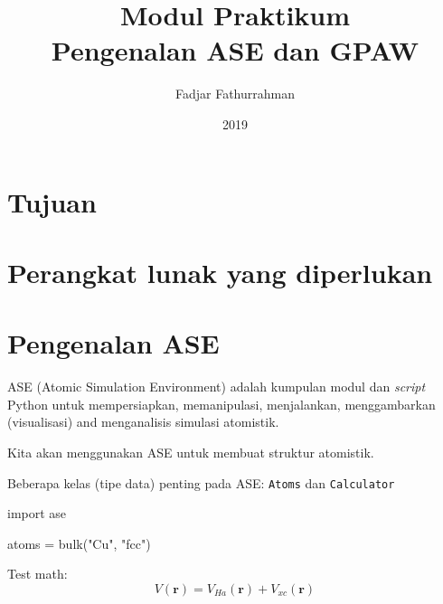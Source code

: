 \documentclass[a4paper,11pt]{extarticle}
\newcommand{\pyinline}[1]{\texttt{#1}}
\begin{document}
\title{
Modul Praktikum \\
Pengenalan \textsf{ASE} dan \textsf{GPAW}}
\author{Fadjar Fathurrahman}
\date{2019}
\maketitle

\section{Tujuan}


\section{Perangkat lunak yang diperlukan}


\section{Pengenalan \textsf{ASE}}

\textsf{ASE} (Atomic Simulation Environment) adalah kumpulan modul dan \textit{script} Python untuk
mempersiapkan, memanipulasi, menjalankan, menggambarkan (visualisasi) and menganalisis simulasi
atomistik.

Kita akan menggunakan \textsf{ASE} untuk membuat struktur atomistik.

Beberapa kelas (tipe data) penting pada \textsf{ASE}: \pyinline{Atoms} dan \pyinline{Calculator}

\begin{pythoncode}
import ase

atoms = bulk("Cu", "fcc")
\end{pythoncode}

Test math:
\begin{equation}
V(\mathbf{r}) = V_{Ha}(\mathbf{r}) + V_{xc}(\mathbf{r})
\end{equation}
\end{document}

